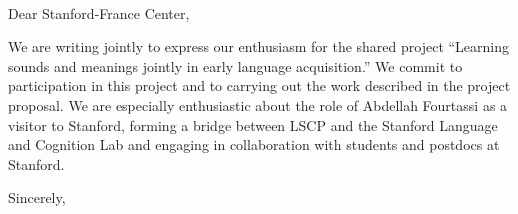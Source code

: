 \documentclass[12pt]{letter}
\begin{document}
\begin{letter}{~~}

\opening{Dear Stanford-France Center,}

We are writing jointly to express our enthusiasm for the shared project ``Learning sounds and meanings jointly in early language acquisition.'' We commit to participation in this project and to carrying out the work described in the project proposal. We are especially enthusiastic about the role of Abdellah Fourtassi as a visitor to Stanford, forming a bridge between LSCP and the Stanford Language and Cognition Lab and engaging in collaboration with students and postdocs at Stanford. 

\closing{Sincerely,}

\end{letter}
\end{document}
